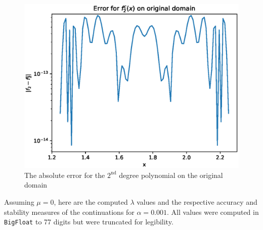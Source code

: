 \documentclass[11pt]{amsart}
\begin{document}
\begin{figure}[h!]
\includegraphics[scale=.5]{Error_f_2.eps}
\caption{The absolute error for the $2^{\text{nd}}$ degree polynomial on the original domain}
\end{figure}



Assuming $\mu = 0$, here are the computed $\lambda$ values and the respective accuracy and stability measures of the continuations for $\alpha = 0.001$. All values were computed in \texttt{BigFloat} to 77 digits but were truncated for legibility.   
\end{document}
